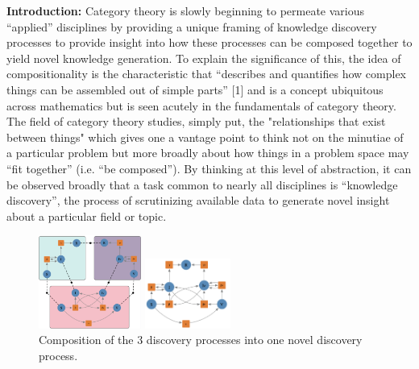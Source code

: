 \documentclass[11pt]{extarticle}
\begin{document}
\textbf{Introduction:} Category theory is slowly beginning to permeate various ``applied'' disciplines by providing a unique framing of knowledge discovery processes to provide insight into how these processes can be composed together to yield novel knowledge generation. %
To explain the significance of this, the idea of compositionality is the characteristic that ``describes and quantifies how complex things can be assembled out of simple parts'' [1] and is a concept ubiquitous across mathematics but is seen acutely in the fundamentals of category theory.
The field of category theory studies, simply put, the "relationships that exist between things" which gives one a vantage point to think not on the minutiae of a particular problem but more broadly about how things in a problem space may ``fit together'' (i.e. ``be composed'').
By thinking at this level of abstraction, it can be observed broadly that a task common to nearly all disciplines is ``knowledge discovery'', the process of scrutinizing available data to generate novel insight about a particular field or topic. %

\begin{figure}
\centering
\includegraphics[width=0.3\textwidth]{sub_models}
\vspace{-10pt}
\caption{
  3 discovery processes (the three different petri nets in boxes) with relationships defined by arrows and lines inside of and between processes. %
}
\vspace{30pt}
\includegraphics[width=0.25\textwidth]{composed_model}
\vspace{-10pt}
\caption{
  Composition of the 3 discovery processes into one novel discovery process. %
}
\end{figure}
\end{document}
